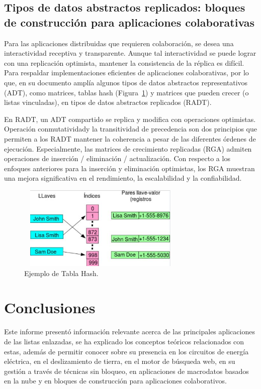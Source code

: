 \documentclass[10pt,journal]{IEEEtran}
\begin{document}
\subsection{\textbf{Tipos de datos abstractos replicados: bloques de construcción para aplicaciones colaborativas}}
Para las aplicaciones distribuidas que requieren colaboración, se desea una interactividad receptiva y transparente. Aunque tal interactividad se puede lograr con una replicación optimista, mantener la consistencia de la réplica es difícil. Para respaldar implementaciones eficientes de aplicaciones colaborativas, por lo que, \citep{ro} en su documento amplía algunos tipos de datos abstractos representativos (ADT), como matrices, tablas hash (Figura~\ref{f6}) y matrices que pueden crecer (o listas vinculadas), en tipos de datos abstractos replicados (RADT). \par En RADT, un ADT compartido se replica y modifica con operaciones optimistas. Operación conmutatividady la transitividad de precedencia son dos principios que permiten a los RADT mantener la coherencia a pesar de las diferentes órdenes de ejecución. Especialmente, las matrices de crecimiento replicadas (RGA) admiten operaciones de inserción / eliminación / actualización. Con respecto a los enfoques anteriores para la inserción y eliminación optimistas, los RGA muestran una mejora significativa en el rendimiento, la escalabilidad y la confiabilidad.
\begin{figure}[H]
 \begin{center}
       \includegraphics[width=8cm, height=4cm]{figuras/6.JPG}
      \caption{Ejemplo de Tabla Hash.}
      \label{f6} 
      \end{center}
\end{figure}
\section{\textbf{Conclusiones}}
Este informe presentó información relevante acerca de las principales aplicaciones de las listas enlazadas, se ha explicado los conceptos teóricos relacionados con estas, además de permitir conocer sobre su presencia en los circuitos de energía eléctrica, en el deslizamiento de tierra, en el motor de búsqueda web, en su gestión a través de técnicas sin bloqueo, en aplicaciones de macrodatos basados en la nube y en bloques de construcción para aplicaciones colaborativos.
\medskip

\end{document}
